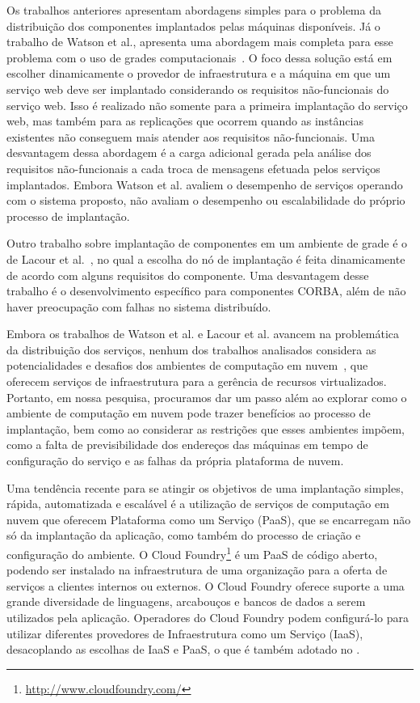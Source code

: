 Os trabalhos anteriores apresentam abordagens simples para o problema da distribuição dos componentes implantados pelas máquinas disponíveis. Já o trabalho de Watson et al., apresenta uma abordagem mais completa para esse problema com o uso de grades computacionais~\cite{Watson2006Dynasoar}. O foco dessa solução está em escolher dinamicamente o provedor de infraestrutura e a máquina em que um serviço web deve ser implantado considerando os requisitos não-funcionais do serviço web. Isso é realizado não somente para a primeira implantação do serviço web, mas também para as replicações que ocorrem quando as instâncias existentes não conseguem mais atender aos requisitos não-funcionais. Uma desvantagem dessa abordagem é a carga adicional gerada pela análise dos requisitos não-funcionais a cada troca de mensagens efetuada pelos serviços implantados. Embora Watson et al. avaliem o desempenho de serviços operando com o sistema proposto, não avaliam o desempenho ou escalabilidade do próprio processo de implantação.

Outro trabalho sobre implantação de componentes em um ambiente de grade é o de Lacour et al.~\cite{Lacour2004Corba}, no qual a escolha do nó de implantação é feita dinamicamente de acordo com alguns requisitos do componente. Uma desvantagem desse trabalho é o desenvolvimento específico para componentes CORBA, além de não haver preocupação com falhas no sistema distribuído.

Embora os trabalhos de Watson et al. e Lacour et al. avancem na problemática da distribuição dos serviços, nenhum dos trabalhos analisados considera as potencialidades e desafios dos ambientes de computação em nuvem~\cite{Amazon2012Practices}, que oferecem serviços de infraestrutura para a gerência de recursos virtualizados. Portanto, em nossa pesquisa, procuramos dar um passo além ao explorar como o ambiente de computação em nuvem pode trazer benefícios ao processo de implantação, bem como ao considerar as restrições que esses ambientes impõem, como a falta de previsibilidade dos endereços das máquinas em tempo de configuração do serviço e as falhas da própria plataforma de nuvem.

Uma tendência recente para se atingir os objetivos de uma implantação simples, rápida, automatizada e escalável é a utilização de serviços de computação em nuvem que oferecem Plataforma como um Serviço (PaaS), que se encarregam não só da implantação da aplicação, como também do processo de criação e configuração do ambiente. O Cloud Foundry\footnote{\url{http://www.cloudfoundry.com/}} é um PaaS de código aberto, podendo ser instalado na infraestrutura de uma organização para a oferta de serviços a clientes internos ou externos. O Cloud Foundry oferece suporte a uma grande diversidade de linguagens, arcabouços e bancos de dados a serem utilizados pela aplicação. Operadores do Cloud Foundry podem configurá-lo para utilizar diferentes provedores de Infraestrutura como um Serviço (IaaS), desacoplando as escolhas de IaaS e PaaS, o que é também adotado no \ee. 


